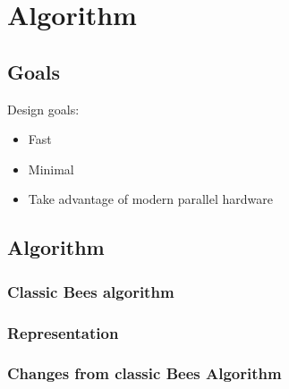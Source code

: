 
\chapter{Algorithm}


\section{Goals}

Design goals:
\begin{itemize}
   \item Fast
   \item Minimal
   \item Take advantage of modern parallel hardware
\end{itemize}


\section{Algorithm}





\subsection{Classic Bees algorithm}

\subsection{Representation}

\subsection{Changes from classic Bees Algorithm}

